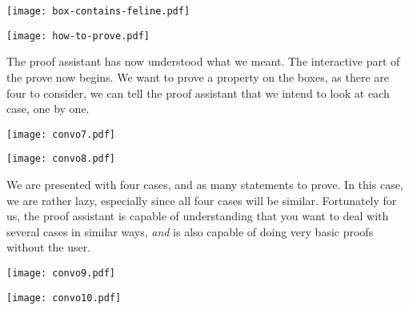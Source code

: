 \begin{center}
  \texttt{[image: box-contains-feline.pdf]}
\end{center}

\begin{center}
  \texttt{[image: how-to-prove.pdf]}
\end{center}

The proof assistant has now understood what we meant. The interactive part of
the prove now begins. We want to prove a property on the boxes, as there are
four to consider, we can tell the proof assistant that we intend to look at each
case, one by one.

\begin{center}
  \texttt{[image: convo7.pdf]}
\end{center}

\begin{center}
  \texttt{[image: convo8.pdf]}
\end{center}

We are presented with four cases, and as many statements to prove.
In this case, we are rather lazy, especially since all four cases will be
similar. Fortunately for us, the proof assistant is capable of understanding
that you want to deal with several cases in similar ways, \emph{and} is also
capable of doing very basic proofs without the user.

\begin{center}
  \texttt{[image: convo9.pdf]}
\end{center}

\begin{center}
  \texttt{[image: convo10.pdf]}
\end{center}